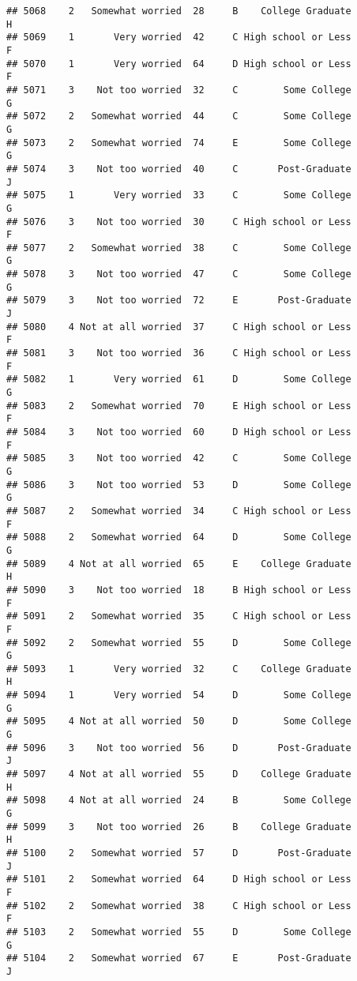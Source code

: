 \documentclass[
]{article}
\begin{document}
\begin{verbatim}
## 5068    2   Somewhat worried  28     B    College Graduate         H
## 5069    1       Very worried  42     C High school or Less         F
## 5070    1       Very worried  64     D High school or Less         F
## 5071    3    Not too worried  32     C        Some College         G
## 5072    2   Somewhat worried  44     C        Some College         G
## 5073    2   Somewhat worried  74     E        Some College         G
## 5074    3    Not too worried  40     C       Post-Graduate         J
## 5075    1       Very worried  33     C        Some College         G
## 5076    3    Not too worried  30     C High school or Less         F
## 5077    2   Somewhat worried  38     C        Some College         G
## 5078    3    Not too worried  47     C        Some College         G
## 5079    3    Not too worried  72     E       Post-Graduate         J
## 5080    4 Not at all worried  37     C High school or Less         F
## 5081    3    Not too worried  36     C High school or Less         F
## 5082    1       Very worried  61     D        Some College         G
## 5083    2   Somewhat worried  70     E High school or Less         F
## 5084    3    Not too worried  60     D High school or Less         F
## 5085    3    Not too worried  42     C        Some College         G
## 5086    3    Not too worried  53     D        Some College         G
## 5087    2   Somewhat worried  34     C High school or Less         F
## 5088    2   Somewhat worried  64     D        Some College         G
## 5089    4 Not at all worried  65     E    College Graduate         H
## 5090    3    Not too worried  18     B High school or Less         F
## 5091    2   Somewhat worried  35     C High school or Less         F
## 5092    2   Somewhat worried  55     D        Some College         G
## 5093    1       Very worried  32     C    College Graduate         H
## 5094    1       Very worried  54     D        Some College         G
## 5095    4 Not at all worried  50     D        Some College         G
## 5096    3    Not too worried  56     D       Post-Graduate         J
## 5097    4 Not at all worried  55     D    College Graduate         H
## 5098    4 Not at all worried  24     B        Some College         G
## 5099    3    Not too worried  26     B    College Graduate         H
## 5100    2   Somewhat worried  57     D       Post-Graduate         J
## 5101    2   Somewhat worried  64     D High school or Less         F
## 5102    2   Somewhat worried  38     C High school or Less         F
## 5103    2   Somewhat worried  55     D        Some College         G
## 5104    2   Somewhat worried  67     E       Post-Graduate         J

\end{verbatim}
\end{document}
